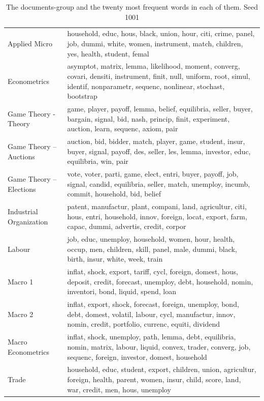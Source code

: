 \begin{table}[tb]
\caption[Groups]{The documents-group and the twenty most frequent words in each of them. Seed 1001}
\label{tab:groups}
\begin{tabularx}{\hsize}{lY}
\toprule
\midrule
Applied Micro & household, educ, hous, black, union, hour, citi, crime, panel, job, dummi, white, women, instrument, match, children, yes, health, student, femal \\
Econometrics & asymptot, matrix, lemma, likelihood, moment, converg, covari, densiti, instrument, finit, null, uniform, root, simul, identif, nonparametr, sequenc, nonlinear, stochast, bootstrap \\
Game Theory -  Theory & game, player, payoff, lemma, belief, equilibria, seller, buyer, bargain, signal, bid, nash, princip, finit, experiment, auction, learn, sequenc, axiom, pair \\
Game Theory – Auctions & auction, bid, bidder, match, player, game, student, insur, buyer, signal, payoff, des, seller, les, lemma, investor, educ, equilibria, win, pair \\
Game Theory – Elections & vote, voter, parti, game, elect, entri, buyer, payoff, job, signal, candid, equilibria, seller, match, unemploy, incumb, commit, household, bid, belief \\
Industrial Organization & patent, manufactur, plant, compani, land, agricultur, citi, hous, entri, household, innov, foreign, locat, export, farm, capac, dummi, advertis, credit, corpor \\
Labour & job, educ, unemploy, household, women, hour, health, occup, men, children, skill, panel, male, dummi, black, birth, insur, white, week, train \\
Macro 1 & inflat, shock, export, tariff, cycl, foreign, domest, hous, deposit, credit, forecast, unemploy, debt, household, nomin, inventori, bond, liquid, spend, loan \\
Macro 2 & inflat, export, shock, forecast, foreign, unemploy, bond, debt, domest, volatil, labour, cycl, manufactur, innov, nomin, credit, portfolio, currenc, equiti, dividend \\
Macro Econometrics & inflat, shock, unemploy, path, lemma, debt, equilibria, nomin, matrix, labour, liquid, convex, trader, converg, job, sequenc, foreign, investor, domest, household \\
Trade & household, educ, student, export, children, union, agricultur, foreign, health, parent, women, insur, child, score, land, war, credit, men, hous, unemploy \\
\bottomrule
\end{tabularx}
\end{table}
